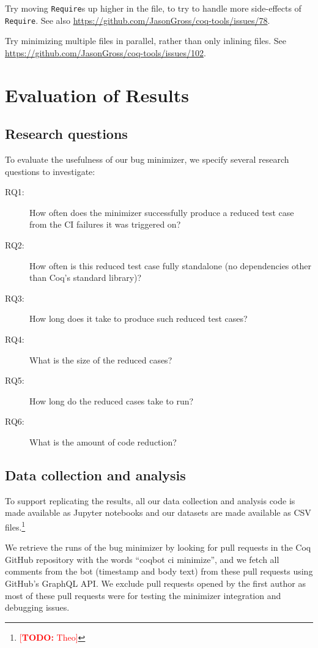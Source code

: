 \documentclass[a4paper,USenglish,cleveref,autoref,thm-restate]{lipics-v2021}
\makeatletter
\newcommand{\todo}[1]{%
\@latex@warning{TODO: \detokenize{#1} on page \thepage}%
\textcolor{red}{[\textbf{TODO:} #1]}}%
\makeatother
\begin{document}
Try moving \texttt{Require}s up higher in the file, to try to handle more side-effects of \texttt{Require}.
See also \url{https://github.com/JasonGross/coq-tools/issues/78}.

Try minimizing multiple files in parallel, rather than only inlining files.
See \url{https://github.com/JasonGross/coq-tools/issues/102}.


\section{Evaluation of Results}

\subsection{Research questions}

To evaluate the usefulness of our bug minimizer, we specify several research questions to investigate:

\begin{description}
\item[RQ1:] How often does the minimizer successfully produce a reduced test case from the CI failures it was triggered on?
\item[RQ2:] How often is this reduced test case fully standalone (no dependencies other than Coq's standard library)?
\item[RQ3:] How long does it take to produce such reduced test cases?
\item[RQ4:] What is the size of the reduced cases?
\item[RQ5:] How long do the reduced cases take to run?
\item[RQ6:] What is the amount of code reduction?
\end{description}

\subsection{Data collection and analysis}

To support replicating the results, all our data collection and analysis code is made available as Jupyter notebooks and our datasets are made available as CSV files.\footnote{\todo{Theo}}

We retrieve the runs of the bug minimizer by looking for pull requests in the Coq GitHub repository with the words ``coqbot ci minimize'', and we fetch all comments from the bot (timestamp and body text) from these pull requests using GitHub's GraphQL API.
We exclude pull requests opened by the first author as most of these pull requests were for testing the minimizer integration and debugging issues.
\end{document}
